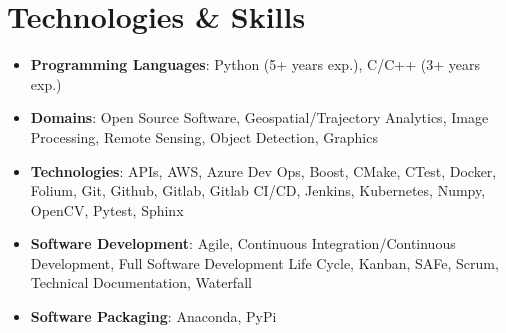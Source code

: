 \documentclass[letterpaper,10pt]{article}
\makeatletter
\newcommand{\resumeAwardItem}[3]{
  \item
    \begin{tabular*}{0.97\textwidth}{l@{\extracolsep{\fill}}r}
      \textbf{#1} \textit{\small #2} & \textit{\small #3} \\
    \end{tabular*}
}
\newcommand{\resumeSubHeadingListStart}{\begin{itemize}[leftmargin=*]}
\newcommand{\resumeSubHeadingListEnd}{\end{itemize}}
\makeatother
\begin{document}
\section{Technologies \& Skills}
 \resumeSubHeadingListStart
   \item{
     \textbf{Programming Languages}{: Python (5+ years exp.), C/C++ (3+ years exp.) }
   }
   \item{
    \textbf{Domains}{: Open Source Software, Geospatial/Trajectory Analytics, Image Processing, Remote Sensing, Object Detection, Graphics}
   }
   \item{
    \textbf{Technologies}{: APIs, AWS, Azure Dev Ops, Boost, CMake, CTest, Docker, Folium, Git, Github, Gitlab, Gitlab CI/CD, Jenkins, Kubernetes, Numpy, OpenCV, Pytest, Sphinx}
   }
   \item{
    \textbf{Software Development}{: Agile, Continuous Integration/Continuous Development, Full Software Development Life Cycle, Kanban, SAFe, Scrum, Technical Documentation, Waterfall}
   }
   \item{
    \textbf{Software Packaging}{: Anaconda, PyPi}
   }
 \resumeSubHeadingListEnd



\end{document}
